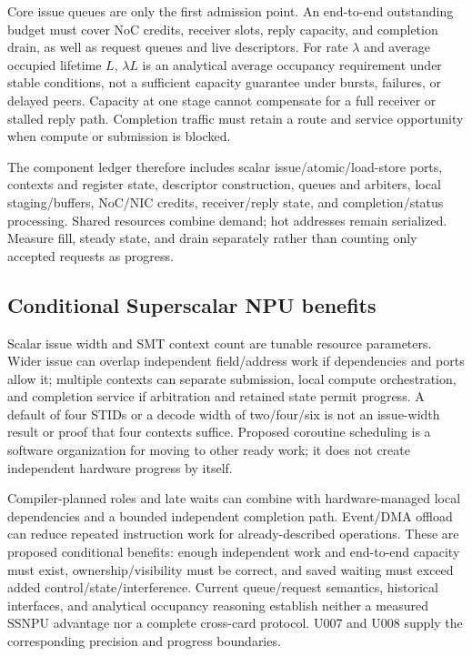 Core issue queues are only the first admission point. An end-to-end outstanding budget must cover NoC credits, receiver slots, reply capacity, and completion drain, as well as request queues and live descriptors. For rate $\lambda$ and average occupied lifetime $L$, $\lambda L$ is an analytical average occupancy requirement under stable conditions, not a sufficient capacity guarantee under bursts, failures, or delayed peers. Capacity at one stage cannot compensate for a full receiver or stalled reply path. Completion traffic must retain a route and service opportunity when compute or submission is blocked.

The component ledger therefore includes scalar issue/atomic/load-store ports, contexts and register state, descriptor construction, queues and arbiters, local staging/buffers, NoC/NIC credits, receiver/reply state, and completion/status processing. Shared resources combine demand; hot addresses remain serialized. Measure fill, steady state, and drain separately rather than counting only accepted requests as progress.

\subsection{Conditional Superscalar NPU benefits}

Scalar issue width and SMT context count are tunable resource parameters. Wider issue can overlap independent field/address work if dependencies and ports allow it; multiple contexts can separate submission, local compute orchestration, and completion service if arbitration and retained state permit progress. A default of four STIDs or a decode width of two/four/six is not an issue-width result or proof that four contexts suffice. Proposed coroutine scheduling is a software organization for moving to other ready work; it does not create independent hardware progress by itself.

Compiler-planned roles and late waits can combine with hardware-managed local dependencies and a bounded independent completion path. Event/DMA offload can reduce repeated instruction work for already-described operations. These are proposed conditional benefits: enough independent work and end-to-end capacity must exist, ownership/visibility must be correct, and saved waiting must exceed added control/state/interference. Current queue/request semantics, historical interfaces, and analytical occupancy reasoning establish neither a measured SSNPU advantage nor a complete cross-card protocol. U007 and U008 supply the corresponding precision and progress boundaries.

